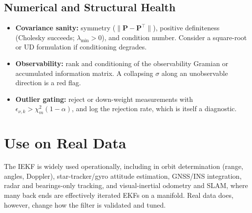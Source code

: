 \documentclass[11pt]{article}
\newcommand{\Pm}{\bm{P}}
\begin{document}
\subsection{Numerical and Structural Health}
\begin{itemize}
  \item \textbf{Covariance sanity:} symmetry ($\|\Pm - \Pm^\top\|$), positive definiteness
        (Cholesky succeeds; $\lambda_{\min} > 0$), and condition number. Consider a square-root
        or UD formulation if conditioning degrades.
  \item \textbf{Observability:} rank and conditioning of the observability Gramian or
        accumulated information matrix. A collapsing $\sigma$ along an unobservable direction is
        a red flag.
  \item \textbf{Outlier gating:} reject or down-weight measurements with
        $\epsilon_{\nu,k} > \chi^2_m(1 - \alpha)$, and log the rejection rate, which is itself a
        diagnostic.
\end{itemize}

\section{Use on Real Data}

The IEKF is widely used operationally, including in orbit determination (range, angles,
Doppler), star-tracker/gyro attitude estimation, GNSS/INS integration, radar and
bearings-only tracking, and visual-inertial odometry and SLAM, where many back ends are
effectively iterated EKFs on a manifold. Real data does, however, change how the filter is
validated and tuned.
\end{document}
